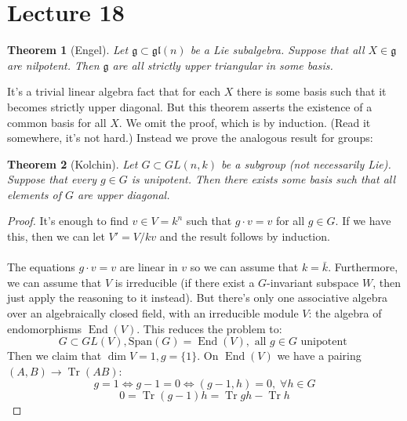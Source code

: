 \documentclass[12 pt]{article}
\DeclareMathOperator {\End} {End}
\DeclareMathOperator {\Tr} {Tr}
\theoremstyle{plain}
\newtheorem*{thm*}{Theorem}
\theoremstyle{definition}
\theoremstyle{remark}
\begin{document}
\section*{Lecture 18}
\begin{thm*} [Engel]
Let $\mathfrak{g} \subset \mathfrak{gl}(n)$ be a Lie subalgebra. Suppose that all $X \in \mathfrak{g}$ are nilpotent. Then $\mathfrak{g}$ are all strictly upper triangular in some basis.
\end{thm*}
It's a trivial linear algebra fact that for each $X$ there is some basis such that it becomes strictly upper diagonal. But this theorem asserts the existence of a common basis for all $X$. We omit the proof, which is by induction. (Read it somewhere, it's not hard.) Instead we prove the analogous result for groups:
\begin{thm*} [Kolchin]
Let $G \subset GL(n,k)$ be a subgroup (not necessarily Lie). Suppose that every $g \in G$ is unipotent. Then there exists some basis such that all elements of $G$ are upper diagonal.
\end{thm*}
\begin{proof}
It's enough to find $v \in V = k^n$ such that $g \cdot v = v$ for all $g \in G$. If we have this, then we can let $V' = V/kv$ and the result follows by induction.
\\
\\
The equations $g\cdot v = v$ are linear in $v$ so we can assume that $k = \bar k$. Furthermore, we can assume that $V$ is irreducible (if there exist a $G$-invariant subspace $W$, then just apply the reasoning to it instead). But there's only one associative algebra over an algebraically closed field, with an irreducible module $V$: the algebra of endomorphisms $\End(V)$. This reduces the problem to:
\[     G \subset GL(V), \text{Span}(G) = \End(V), \text{ all } g\in G \text{ unipotent }       \]
Then we claim that $\dim V = 1, g = \{1\}$. On $\End(V)$ we have a pairing $(A, B) \to \Tr(AB)$:
\[        g = 1 \Leftrightarrow g - 1 = 0 \Leftrightarrow (g-1, h) = 0,\; \forall h\in G         \]
\[         0 = \Tr(g-1)h = \Tr gh - \Tr h        \]
\end{proof}
\end{document}
